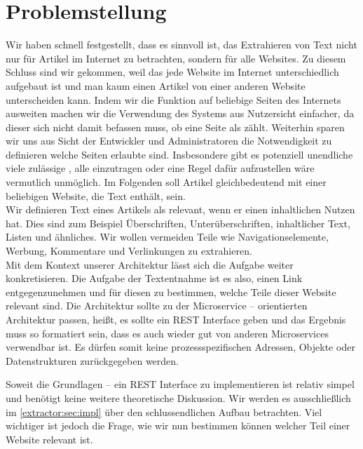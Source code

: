 \section{Problemstellung}
Wir haben schnell festgestellt, dass es sinnvoll ist, das Extrahieren von Text nicht nur für Artikel im Internet zu betrachten, sondern für alle Websites. Zu diesem Schluss sind wir gekommen, weil das jede Website im Internet unterschiedlich aufgebaut ist und man kaum einen Artikel von einer anderen Website unterscheiden kann. Indem wir die Funktion auf beliebige Seiten des Internets ausweiten machen wir die Verwendung des Systems aus Nutzersicht einfacher, da dieser sich nicht damit befassen muss, ob eine Seite als  zählt. Weiterhin sparen wir uns aus Sicht der Entwickler und Administratoren die Notwendigkeit zu definieren welche Seiten erlaubte  sind. Insbesondere gibt es potenziell unendliche viele zulässige , alle einzutragen oder eine Regel dafür aufzustellen wäre vermutlich unmöglich.
Im Folgenden soll Artikel gleichbedeutend mit einer beliebigen Website, die Text enthält, sein.\\
Wir definieren Text eines Artikels als relevant, wenn er einen inhaltlichen Nutzen hat. Dies sind zum Beispiel Überschriften, Unterüberschriften, inhaltlicher Text, Listen und ähnliches. Wir wollen vermeiden Teile wie Navigationselemente, Werbung, Kommentare und Verlinkungen zu extrahieren. \\
Mit dem Kontext unserer Architektur lässt sich die Aufgabe weiter konkretisieren. Die Aufgabe der Textentnahme ist es also, einen Link entgegenzunehmen und für diesen zu bestimmen, welche Teile dieser Website relevant sind. Die Architektur sollte zu der Microservice – orientierten Architektur passen, heißt, es sollte ein REST Interface geben und das Ergebnis muss so formatiert sein, dass es auch wieder gut von anderen Microservices verwendbar ist. Es dürfen somit keine prozessspezifischen Adressen, Objekte oder Datenstrukturen zurückgegeben werden. \\ \par
Soweit die Grundlagen – ein REST Interface zu implementieren ist relativ simpel und benötigt keine weitere theoretische Diskussion. Wir werden es ausschließlich im \autoref{extractor:sec:impl} über den schlussendlichen Aufbau betrachten. Viel wichtiger ist jedoch die Frage, wie wir nun bestimmen können welcher Teil einer Website relevant ist. 

